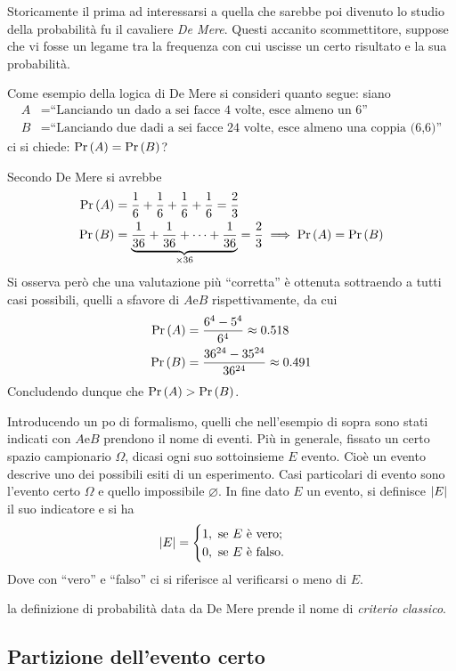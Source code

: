 \documentclass{subfiles}
\begin{document}
Storicamente il prima ad interessarsi a quella che sarebbe poi divenuto lo studio della probabilità fu il cavaliere \emph{De Mere}.
Questi accanito scommettitore, suppose che vi fosse un legame tra la frequenza con cui uscisse un certo risultato e la sua probabilità.
\begin{Example*}
    Come esempio della logica di De Mere si consideri quanto segue: siano
    \[\begin{aligned}
            A & = \text{``Lanciando un dado a sei facce 4 volte, esce almeno un 6''}               \\
            B & = \text{``Lanciando due dadi a sei facce 24 volte, esce almeno una coppia (6,6)''}
        \end{aligned}\]
    ci si chiede: \(\Prob{A} = \Prob{B}\)?

    Secondo De Mere si avrebbe
    \[\begin{aligned}
            \Prob{A} & = \Frac{1}{6} + \Frac{1}{6} + \Frac{1}{6} + \Frac{1}{6} = \Frac{2}{3}                                                     \\
            \Prob{B} & = \underbrace{\Frac{1}{36} + \Frac{1}{36} + \cdots + \Frac{1}{36}}_{\times 36} = \Frac{2}{3} \implies \Prob{A} = \Prob{B}
        \end{aligned}\]
    Si osserva però che una valutazione più ``corretta'' è ottenuta sottraendo a tutti casi possibili, quelli a sfavore di \(A \text{e} B\) rispettivamente,
    da cui
    \[\begin{aligned}
            \Prob{A} & = \Frac{6^{4} - 5^{4}}{6^{4}} \approx 0.518       \\
            \Prob{B} & = \Frac{36^{24} - 35^{24}}{36^{24}} \approx 0.491
        \end{aligned}\]
    Concludendo dunque che \(\Prob{A} > \Prob{B}\).
\end{Example*}

Introducendo un po di formalismo, quelli che nell'esempio di sopra sono stati indicati con \(A \text{e} B\) prendono il nome di eventi.
Più in generale, fissato un certo spazio campionario \(\Omega\), dicasi ogni suo sottoinsieme \(E\) evento.
Cioè un evento descrive uno dei possibili esiti di un esperimento.
Casi particolari di evento sono l'evento certo \(\Omega\) e quello impossibile \(\varnothing\).
In fine dato \(E\) un evento, si definisce \(\left\vert E \right\vert\) il suo indicatore e si ha
\[\Abs{E} = \begin{cases}
        1, \text{se \(E\) è vero;} \\
        0, \text{se \(E\) è falso.}
    \end{cases}\]
Dove con ``vero'' e ``falso'' ci si riferisce al verificarsi o meno di \(E\).

\begin{Note*}
    la definizione di probabilità data da De Mere prende il nome di \emph{criterio classico}.
\end{Note*}

\subsection{Partizione dell'evento certo}

\clearpage
\end{document}
